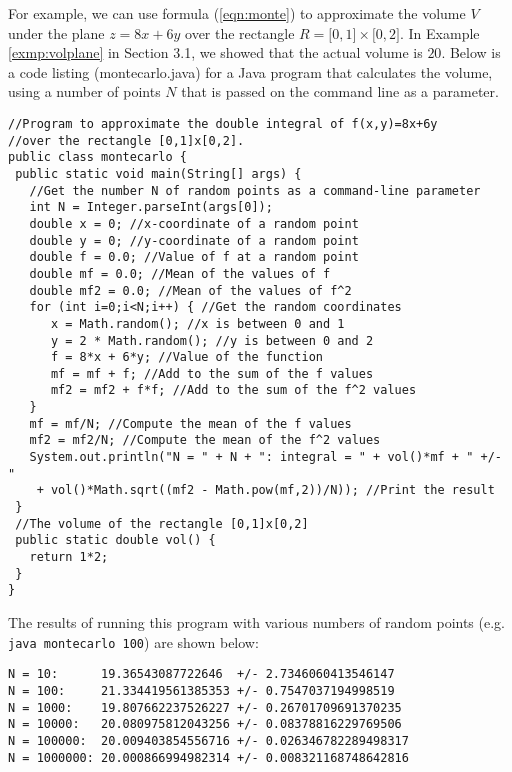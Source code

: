 For example, we can use formula (\ref{eqn:monte}) to approximate the volume $V$ under the plane $z=8x+6y$ over the
rectangle $R = \lbrack 0,1 \rbrack \times \lbrack 0,2 \rbrack$. In Example \ref{exmp:volplane} in Section 3.1, we showed
that the actual volume is $20$. Below is a code listing (montecarlo.java) for a Java program that calculates the volume,
using a number of points $N$ that is passed on the command line as a parameter.

\vspace{3mm}
\begin{lstlisting}
//Program to approximate the double integral of f(x,y)=8x+6y
//over the rectangle [0,1]x[0,2].
public class montecarlo {
 public static void main(String[] args) {
   //Get the number N of random points as a command-line parameter
   int N = Integer.parseInt(args[0]);
   double x = 0; //x-coordinate of a random point
   double y = 0; //y-coordinate of a random point
   double f = 0.0; //Value of f at a random point
   double mf = 0.0; //Mean of the values of f
   double mf2 = 0.0; //Mean of the values of f^2
   for (int i=0;i<N;i++) { //Get the random coordinates
      x = Math.random(); //x is between 0 and 1
      y = 2 * Math.random(); //y is between 0 and 2
      f = 8*x + 6*y; //Value of the function
      mf = mf + f; //Add to the sum of the f values
      mf2 = mf2 + f*f; //Add to the sum of the f^2 values
   }
   mf = mf/N; //Compute the mean of the f values
   mf2 = mf2/N; //Compute the mean of the f^2 values
   System.out.println("N = " + N + ": integral = " + vol()*mf + " +/- "
    + vol()*Math.sqrt((mf2 - Math.pow(mf,2))/N)); //Print the result
 }
 //The volume of the rectangle [0,1]x[0,2]
 public static double vol() {
   return 1*2;
 }
}
\end{lstlisting}
\vspace{3mm}

The results of running this program with various numbers of random points (e.g. \texttt{java montecarlo 100}) are
shown below:
\newpage
\begin{verbatim}
N = 10:      19.36543087722646  +/- 2.7346060413546147
N = 100:     21.334419561385353 +/- 0.7547037194998519
N = 1000:    19.807662237526227 +/- 0.26701709691370235
N = 10000:   20.080975812043256 +/- 0.08378816229769506
N = 100000:  20.009403854556716 +/- 0.026346782289498317
N = 1000000: 20.000866994982314 +/- 0.008321168748642816
\end{verbatim}

